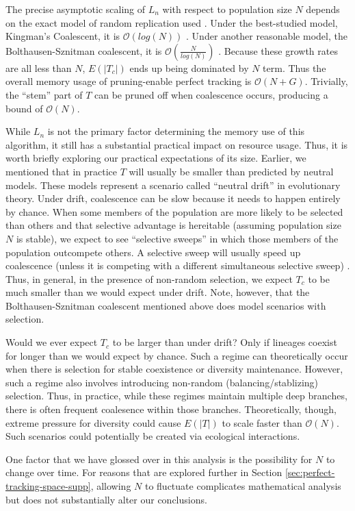 The precise asymptotic scaling of $L_n$ with respect to population size $N$ depends on the exact model of random replication used \citep{tellierCoalescenceMultipleBranching2014}.
Under the best-studied model, Kingman's Coalescent, it is $\mathcal{O}(log(N))$ \citep{kingmanCoalescent1982, delmasAsymptoticResultsLength2008}.
Under another reasonable model, the Bolthausen-Sznitman coalescent, it is $\mathcal{O}(\frac{N}{log(N)})$ \citep{drmotaAsymptoticResultsConcerning2007}.
Because these growth rates are all less than $N$, $E(|T_c|)$ ends up being dominated by $N$ term. 
Thus the overall memory usage of pruning-enable perfect tracking is $\mathcal{O}(N + G)$.
Trivially, the ``stem'' part of $T$ can be pruned off when coalescence occurs, producing a bound of $\mathcal{O}(N)$.

While $L_n$ is not the primary factor determining the memory use of this algorithm, it still has a substantial practical impact on resource usage.
Thus, it is worth briefly exploring our practical expectations of its size.
Earlier, we mentioned that in practice $T$ will usually be smaller than predicted by neutral models.
These models represent a scenario called ``neutral drift'' in evolutionary theory. 
Under drift, coalescence can be slow because it needs to happen entirely by chance.
When some members of the population are more likely to be selected than others and that selective advantage is hereitable (assuming population size $N$ is stable), we expect to see ``selective sweeps'' in which those members of the population outcompete others.
A selective sweep will usually speed up coalescence (unless it is competing with a different simultaneous selective sweep) \citep{neherGeneticDraftSelective2013}.
Thus, in general, in the presence of non-random selection, we expect $T_c$ to be much smaller than we would expect under drift.
Note, however, that the Bolthausen-Sznitman coalescent mentioned above does model scenarios with selection.

Would we ever expect $T_c$ to be larger than under drift?
Only if lineages coexist for longer than we would expect by chance.
Such a regime can theoretically occur when there is selection for stable coexistence or diversity maintenance.
However, such a regime also involves introducing non-random (balancing/stablizing) selection.
Thus, in practice, while these regimes maintain multiple deep branches, there is often frequent coalesence within those branches.
Theoretically, though, extreme pressure for diversity could cause $E(|T|)$ to scale faster than $\mathcal{O}(N)$.
Such scenarios could potentially be created via ecological interactions.

One factor that we have glossed over in this analysis is the possibility for $N$ to change over time.
For reasons that are explored further in Section \ref{sec:perfect-tracking-space-supp}, allowing $N$ to fluctuate complicates mathematical analysis but does not substantially alter our conclusions.

